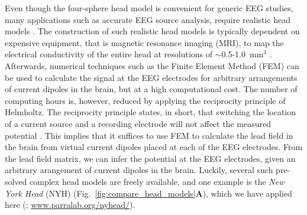 \documentclass[preprint,10pt,authoryear]{elsarticle}
\newcommand{\hlb}[2][NavyBlue]{ {\sethlcolor{#1} \hl{#2}} }
\newcommand{\hlg}[2][Emerald]{ {\sethlcolor{#1} \hl{#2}} }
\newcommand{\snnote}[1]{\color{white}{\hlb{SN: #1 }}\color{black}}
\newcommand{\sntxt}[1]{{\color{NavyBlue}#1}}
\newcommand{\tvnnote}[1]{\color{white}{\hlg{TVN: #1 }}\color{black}}
\begin{document}
Even though the four-sphere head model is convenient for generic EEG studies, many applications such as accurate EEG source analysis, require realistic head models \citep{DALE1999, VORWERK2014}.
The construction of such realistic head models is typically dependent on expensive equipment, %
that is magnetic resonance imaging (MRI), to map the electrical conductivity of the entire head at resolutions of $\sim$0.5-1.0~mm$^3$
\citep{HUANG2015, HUANG2016}. Afterwards, numerical techniques such as the Finite Element Method (FEM) \citep{LOGG2012} can be used to calculate the signal at the EEG electrodes for arbitrary arrangements of current dipoles in the brain, but at a high computational cost.
The number of computing hours is, however, reduced by applying the reciprocity principle of Helmholtz. The reciprocity principle states, in short, that switching the location of a current source and a recording electrode will not affect the measured potential \citep{Malmivuo1995, Ziegler2014, HUANG2016, Dmochowski2017}. This implies that it suffices to use FEM to calculate the lead field in the brain from virtual current dipoles placed at each of the EEG electrodes. From the lead field matrix, we can infer the potential at the EEG electrodes, given an arbitrary arangement of current dipoles in the brain.
Luckily, several such pre-solved complex head models are freely available, and one example is the {\it New York Head} (NYH) (Fig.~\ref{fig:compare_head_models}\textbf{A}), which we have applied here (\cite{HUANG2016}; \url{www.parralab.org/nyhead/}).
\end{document}
